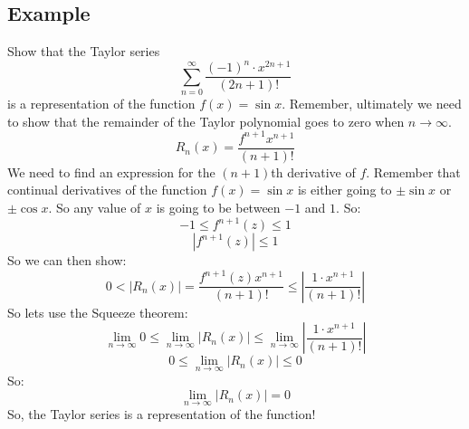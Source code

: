 \documentclass{report}
\begin{document}
    \subsection{Example}
        Show that the Taylor series
        \[\sum_{n=0}^{\infty} \frac{(-1)^n \cdot x^{2n+1}}{(2n+1)!}\]
        is a representation of the function \(f(x) = \sin x\).
        Remember, ultimately we need to show that the remainder of the Taylor polynomial goes to zero when \(n \to \infty\).
        \[R_n(x) = \frac{f^{n+1} x^{n+1}}{(n+1)!}\]
        We need to find an expression for the \((n+1)\)th derivative of \(f\).
        Remember that continual derivatives of the function \(f(x) = \sin x\) is either going to \(\pm \sin x\) or \(\pm \cos x\).
        So any value of \(x\) is going to be between \(-1\) and \(1\).
        So:
        \[-1 \leq f^{n+1}(z) \leq 1\]
        \[\left| f^{n+1}(z) \right| \leq 1\]
        So we can then show:
        \[0 < \left| R_n(x) \right| = \frac{f^{n+1}(z) x^{n+1}}{(n+1)!} \leq \left| \frac{1 \cdot x^{n+1}}{(n+1)!} \right|\]
        So lets use the Squeeze theorem:
        \[\lim_{n \to \infty} 0 \leq \lim_{n \to \infty} \left| R_n(x) \right| \leq \lim_{n \to \infty} \left| \frac{1 \cdot x^{n+1}}{(n+1)!} \right|\]
        \[0 \leq \lim_{n \to \infty} \left| R_n(x) \right| \leq 0 \]
        So:
        \[\lim_{n \to \infty} \left| R_n(x) \right| = 0\]
        So, the Taylor series is a representation of the function!
\end{document}
